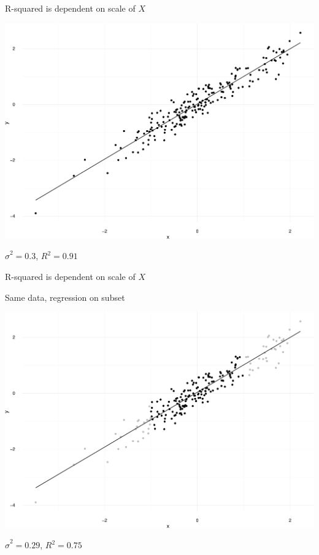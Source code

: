 \documentclass[ignorenonframetext,]{beamer}
\begin{document}
\begin{frame}{R-squared is dependent on scale of \(X\)}

\includegraphics{r2_regression_fit_files/figure-beamer/unnamed-chunk-2-1.pdf}

\(\hat{\sigma}^2 = 0.3\), \(R^2 = 0.91\)

\end{frame}

\begin{frame}{R-squared is dependent on scale of \(X\)}

Same data, regression on subset

\includegraphics{r2_regression_fit_files/figure-beamer/unnamed-chunk-3-1.pdf}

\(\hat{\sigma}^2 = 0.29\), \(R^2 = 0.75\)

\end{frame}
\end{document}
